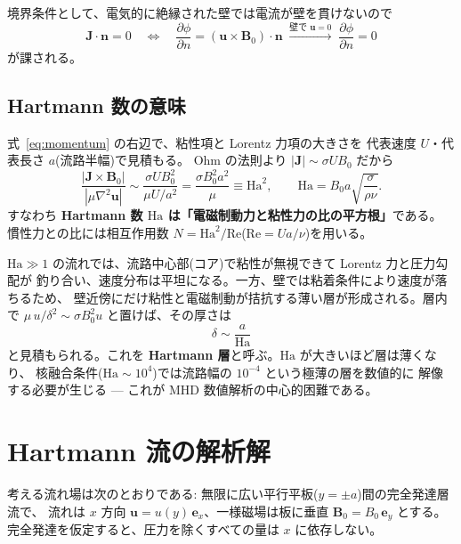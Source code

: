 \documentclass{ltjsarticle}   %
\newcommand{\Ha}{\mathrm{Ha}}
\newcommand{\Rey}{\mathrm{Re}}
\begin{document}
境界条件として、電気的に絶縁された壁では電流が壁を貫けないので
\begin{equation}
  \boldsymbol{J}\cdot\boldsymbol{n} = 0
  \quad\Longleftrightarrow\quad
  \frac{\partial\phi}{\partial n} = (\boldsymbol{u}\times\boldsymbol{B}_0)\cdot\boldsymbol{n}
  \;\xrightarrow{\text{壁で }\boldsymbol{u}=0}\;
  \frac{\partial\phi}{\partial n} = 0
  \label{eq:insulating}
\end{equation}
が課される。

\subsection{Hartmann 数の意味}

式~\eqref{eq:momentum} の右辺で、粘性項と Lorentz 力項の大きさを
代表速度 $U$・代表長さ $a$(流路半幅)で見積もる。
Ohm の法則より $|\boldsymbol{J}| \sim \sigma U B_0$ だから
\begin{equation}
  \frac{|\boldsymbol{J}\times\boldsymbol{B}_0|}{|\mu\nabla^2\boldsymbol{u}|}
  \sim \frac{\sigma U B_0^2}{\mu U / a^2}
  = \frac{\sigma B_0^2 a^2}{\mu} \equiv \Ha^2,
  \qquad
  \Ha = B_0 a \sqrt{\frac{\sigma}{\rho\nu}}.
  \label{eq:hartmann-number}
\end{equation}
すなわち \textbf{Hartmann 数 $\Ha$ は「電磁制動力と粘性力の比の平方根」}である。
慣性力との比には相互作用数 $N=\Ha^2/\Rey$($\Rey=Ua/\nu$)を用いる。

$\Ha\gg 1$ の流れでは、流路中心部(コア)で粘性が無視できて Lorentz 力と圧力勾配が
釣り合い、速度分布は平坦になる。一方、壁では粘着条件により速度が落ちるため、
壁近傍にだけ粘性と電磁制動が拮抗する薄い層が形成される。層内で
$\mu\, u/\delta^2 \sim \sigma B_0^2 u$ と置けば、その厚さは
\begin{equation}
  \delta \sim \frac{a}{\Ha}
\end{equation}
と見積もられる。これを \textbf{Hartmann 層}と呼ぶ。$\Ha$ が大きいほど層は薄くなり、
核融合条件($\Ha\sim 10^4$)では流路幅の $10^{-4}$ という極薄の層を数値的に
解像する必要が生じる --- これが MHD 数値解析の中心的困難である。

\section{Hartmann 流の解析解}
\label{sec:analytic}

考える流れ場は次のとおりである: 無限に広い平行平板($y=\pm a$)間の完全発達層流で、
流れは $x$ 方向 $\boldsymbol{u}=u(y)\,\boldsymbol{e}_x$、一様磁場は板に垂直
$\boldsymbol{B}_0=B_0\,\boldsymbol{e}_y$ とする。
完全発達を仮定すると、圧力を除くすべての量は $x$ に依存しない。
\end{document}
